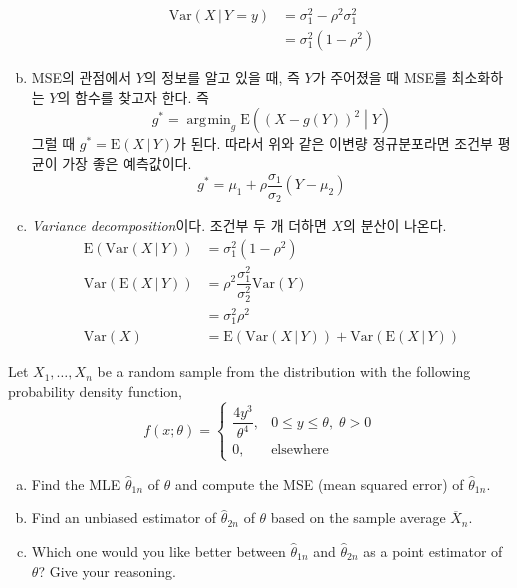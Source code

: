 \documentclass[answers]{exam}
\DeclareMathOperator*{\argmin}{\arg\!\min}
\begin{document}
\begin{questions}
\begin{solution}
\begin{enumerate}[(a)]
\begin{align}
        \mathrm{Var}\left(X\,|\,Y=y\right) &= \sigma_{1}^{2}-\rho^{2}\sigma_{1}^{2}\\
        &= \sigma_{1}^{2}\left(1-\rho^{2}\right)
      \end{align}
      \item MSE의 관점에서 $Y$의 정보를 알고 있을 때, 즉 $Y$가 주어졌을 때 MSE를 최소화하는 $Y$의 함수를 찾고자 한다. 즉
      \begin{equation}
        g^{*} = \argmin_{g}\mathrm{E}\left(\left(X-g\left(Y\right)\right)^{2}\middle| Y\right)
      \end{equation}
      그럴 때 $g^{*}=\mathrm{E}\left(X\,|\,Y\right)$가 된다. 따라서 위와 같은 이변량 정규분포라면 조건부 평균이 가장 좋은 예측값이다.
      \begin{equation}
        g^{*} =\mu_{1}+\rho\dfrac{\sigma_{1}}{\sigma_{2}}\left(Y-\mu_{2}\right)
      \end{equation}
      \item \emph{Variance decomposition}이다. 조건부 두 개 더하면 $X$의 분산이 나온다.
      \begin{align}
        \mathrm{E}\left(\mathrm{Var}\left(X\,|\,Y\right)\right) &= \sigma_{1}^{2}\left(1-\rho^{2}\right)\\
        \mathrm{Var}\left(\mathrm{E}\left(X\,|\,Y\right)\right) &= \rho^{2}\dfrac{\sigma_{1}^{2}}{\sigma_{2}^{2}}\mathrm{Var}\left(Y\right)\\
        &=\sigma_{1}^{2}\rho^{2}\\
        \mathrm{Var}\left(X\right) &= \mathrm{E}\left(\mathrm{Var}\left(X\,|\,Y\right)\right) + \mathrm{Var}\left(\mathrm{E}\left(X\,|\,Y\right)\right)
      \end{align}
    \end{enumerate}
   \end{solution}
   \question
   Let $X_{1},\ldots,X_{n}$ be a random sample from the distribution with the following probability density function,
   $$
    f\left(x;\theta\right) = \begin{cases}\dfrac{4y^{3}}{\theta^{4}},&0\leq y\leq\theta,\; \theta>0\\ 0,&\text{elsewhere}\end{cases}
   $$
   \begin{enumerate}[(a)]
    \item Find the MLE $\widehat{\theta}_{1n}$ of $\theta$ and compute the MSE (mean squared error) of $\widehat{\theta}_{1n}$.
    \item Find an unbiased estimator of $\widehat{\theta}_{2n}$ of $\theta$ based on the sample average $\overline{X}_{n}$.
    \item Which one would you like better between $\widehat{\theta}_{1n}$ and $\widehat{\theta}_{2n}$ as a point estimator of $\theta$? Give your reasoning.
   \end{enumerate}
   \begin{solution}


\end{solution}
\end{questions}
\end{document}
